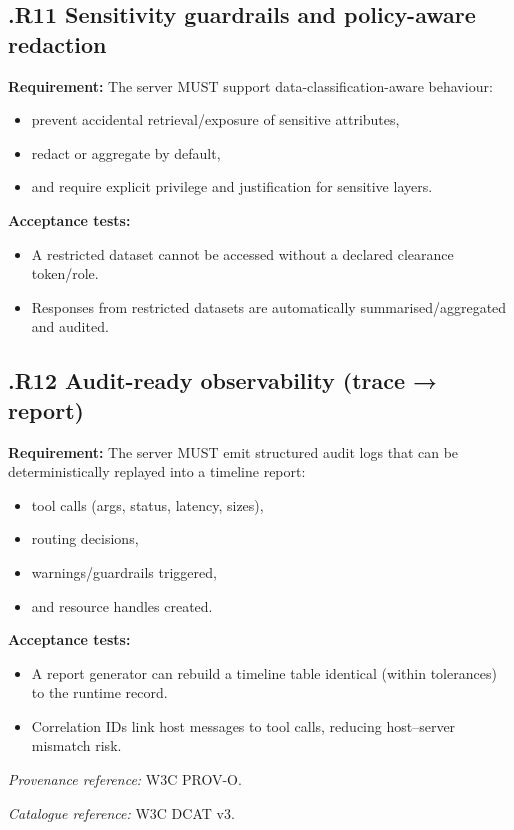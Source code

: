 \subsection*{\thesection.R11 Sensitivity guardrails and policy-aware redaction}
\textbf{Requirement:} The server MUST support data-classification-aware behaviour: \cite{ico_ai_data_protection,five_safes_framework,data_ai_ethics_framework,ncsc_secure_ai_guidelines}
\begin{itemize}[leftmargin=*]
\item prevent accidental retrieval/exposure of sensitive attributes,
\item redact or aggregate by default,
\item and require explicit privilege and justification for sensitive layers.
\end{itemize}

\textbf{Acceptance tests:}
\begin{itemize}[leftmargin=*]
\item A restricted dataset cannot be accessed without a declared clearance token/role.
\item Responses from restricted datasets are automatically summarised/aggregated and audited.
\end{itemize}

\subsection*{\thesection.R12 Audit-ready observability (trace → report)}
\textbf{Requirement:} The server MUST emit structured audit logs that can be deterministically replayed into a timeline report: \cite{algorithmic_transparency_recording_standard,prov_o,mcp_spec_2025_11_25,ncsc_secure_ai_guidelines}
\begin{itemize}[leftmargin=*]
\item tool calls (args, status, latency, sizes),
\item routing decisions,
\item warnings/guardrails triggered,
\item and resource handles created.
\end{itemize}

\textbf{Acceptance tests:}
\begin{itemize}[leftmargin=*]
\item A report generator can rebuild a timeline table identical (within tolerances) to the runtime record.
\item Correlation IDs link host messages to tool calls, reducing host–server mismatch risk.
\end{itemize}

\textit{Provenance reference:} W3C PROV-O. \cite{prov_o}

\textit{Catalogue reference:} W3C DCAT v3. \cite{dcat3}

